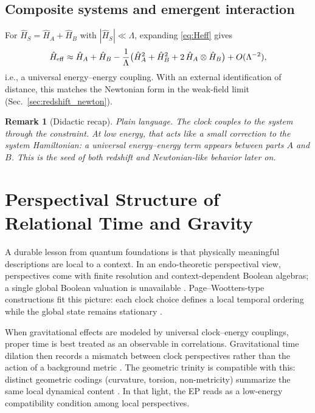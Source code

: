 \documentclass[11pt,a4paper]{article}
\theoremstyle{thmstyleone}
\theoremstyle{thmstyletwo}
\newtheorem{remark}{Remark}
\theoremstyle{thmstylethree}
\begin{document}
    \subsection{Composite systems and emergent interaction}\label{subsec:emergent}
        For $\hat{H}_S=\hat{H}_A+\hat{H}_B$ with $|\hat{H}_S|\ll\Lambda$, expanding \eqref{eq:Heff} gives
        \begin{equation}
            \hat{H}_{\rm eff} \approx \hat{H}_A+\hat{H}_B -\frac{1}{\Lambda}\bigl(\hat{H}_A^2+\hat{H}_B^2+2\,\hat{H}_A\otimes \hat{H}_B\bigr)+O(\Lambda^{-2}),
            \label{eq:Heff_expand}
        \end{equation}
        i.e., a universal energy--energy coupling. With an external identification of distance, this matches the Newtonian form in the weak-field limit (Sec.~\ref{sec:redshift_newton}).

        \begin{remark}[Didactic recap]
            \emph{Plain language.} The clock couples to the system through the constraint. At low energy, that acts like a small correction to the system Hamiltonian: a universal energy–energy term appears between parts $A$ and $B$. This is the seed of both redshift and Newtonian-like behavior later on.
        \end{remark}

    \section{Perspectival Structure of Relational Time and Gravity}\label{sec:perspectival}
    A durable lesson from quantum foundations is that physically meaningful descriptions are local to a context. In an endo-theoretic perspectival view, perspectives come with finite resolution and context-dependent Boolean algebras; a single global Boolean valuation is unavailable \cite{KarakostasZafiris2025}. Page--Wootters-type constructions fit this picture: each clock choice defines a local temporal ordering while the global state remains stationary \cite{PageWootters1983,Wootters1984}.

    When gravitational effects are modeled by universal clock--energy couplings, proper time is best treated as an observable in correlations. Gravitational time dilation then records a mismatch between clock perspectives rather than the action of a background metric \cite{SinghFriedrich2025}. The geometric trinity is compatible with this: distinct geometric codings (curvature, torsion, non-metricity) summarize the same local dynamical content \cite{BeltranJimenez2018,AldrovandiPereira2013,ManciniTinoCapozziello2025}. In that light, the EP reads as a low-energy compatibility condition among local perspectives.
\end{document}
